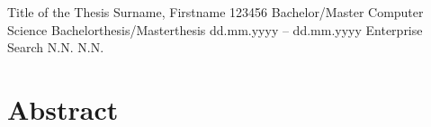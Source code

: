 





\sloppy

  \UDOTitle
      {Title of the Thesis}                         %
      {Surname, Firstname}                          %
      {123456}                                      %
      {Bachelor/Master Computer Science}            %
      {Bachelorthesis/Masterthesis}					%
      {dd.mm.yyyy -- dd.mm.yyyy}                    %
      {Enterprise Search}                           %
      {N.N.}										%
      {N.N.}                                        %
  \clearpage



\setcounter{page}{1}

\chapter*{Abstract}

\lipsum[1-3]




\thispagestyle{referencelist}
\clearpage
{}

\tableofcontents
\thispagestyle{referencelist}
\clearpage

\setcounter{page}{3}

